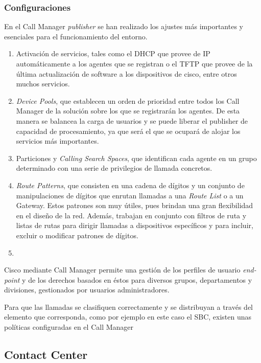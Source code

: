 \documentclass[a4paper, 12pt]{book}
\begin{document}
\subsubsection{Configuraciones}
\label{sec:conf_cucm}
En el Call Manager \emph{publisher} se han realizado los ajustes más importantes y esenciales para el funcionamiento del entorno.
\begin{enumerate}
  \item Activación de servicios, tales como el DHCP que provee de IP automáticamente a los agentes que se registran o el TFTP que provee de la última actualización de software a los dispositivos de cisco, entre otros muchos servicios.
  \item \emph{Device Pools}, que establecen un orden de prioridad entre todos los Call Manager de la solución sobre los que se registrarán los agentes. De esta manera se balancea la carga de usuarios y se puede liberar el publisher de capacidad de procesamiento, ya que será el que se ocupará de alojar los servicios más importantes.
  \item Particiones y \emph{Calling Search Spaces}, que identifican cada agente en un grupo determinado con una serie de privilegios de llamada concretos.
  \item \emph{Route Patterns}, que consisten en una cadena de dígitos y un conjunto de manipulaciones de dígitos que enrutan llamadas a una \emph{Route List} o a un Gateway. Estos patrones son muy útiles, pues brindan una gran flexibilidad en el diseño de la red. Además, trabajan en conjunto con filtros de ruta y listas de rutas para dirigir llamadas a dispositivos específicos y para incluir, excluir o modificar patrones de dígitos.
  \item 
\end{enumerate}


Cisco mediante Call Manager permite una gestión de los perfiles de usuario \emph{end-point} y de los derechos basados en éstos para diversos grupos, departamentos y divisiones, gestionados por usuarios administradores.

Para que las llamadas se clasifiquen correctamente y se distribuyan a través del elemento que corresponda, como por ejemplo en este caso el SBC, existen unas políticas configuradas en el Call Manager

\subsection{Contact Center}
\label{sec:contact_center}
\end{document}
